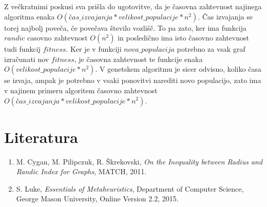 \documentclass[a4paper, 10pt]{article}
\begin{document}
Z večkratnimi poskusi sva prišla do ugotovitve, da je časovna zahtevnost najinega algoritma enaka $O(čas\_izvajanja * velikost\_populacije * n^2)$.  Čas izvajanja se torej najbolj poveča, če povečava število vozlišč. To pa zato, ker ima funkcija $randic$ casovno zahtevnost $O(n^2)$ in posledično ima isto časovno zahtevnost tudi funkcij $fitness$.  Ker je v funkciji $nova\_populacija$ potrebno za vsak graf izračunati nov $fitness$, je časovna zahtevnost te funkcije enaka $O(velikost\_populacije * n^2)$. V genetskem algoritmu je sicer odvisno, koliko časa se izvaja, ampak  je potrebno v vsaki ponovitvi narediti novo populacijo, zato ima v najinem primeru algoritem časovno zahtevnost $O(čas\_izvajanja * velikost\_populacije * n^2)$.

\pagebreak

\section{Literatura}
\vspace{0.5cm}

\renewcommand{\labelenumi}{[\arabic{enumi}]}
\begin{enumerate}
\item \noindent M. Cygan, M. Pilipczuk, R. Škrekovski, \textsl{On the Inequality between Radius and Randic Index for Graphs}, MATCH, 2011. 
\vspace{0.5cm}
\item \noindent  S. Luke, \textsl{Essentials of Metaheuristics}, Department of Computer Science, George Mason University, Online Version 2.2, 2015.
\end{enumerate}
\end{document}
